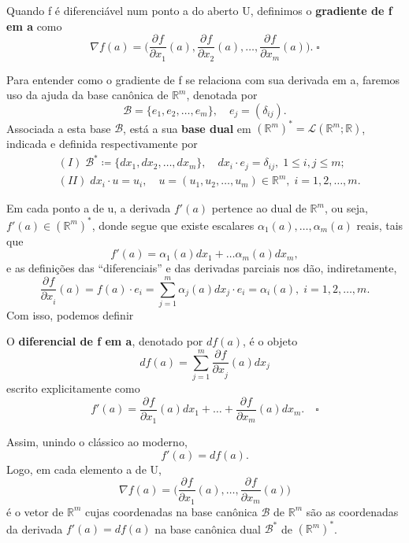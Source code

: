 \documentclass[../analysisII_notes.tex]{subfiles}
\begin{document}
\begin{def*}
	Quando f é diferenciável num ponto a do aberto U, definimos o \textbf{gradiente de f em a} como
	\[
		\nabla f(a) = \biggl(\frac{\partial^{}f}{\partial x_1^{}}(a), \frac{\partial^{}f}{\partial x_2^{}}(a), \dotsc , \frac{\partial^{}f}{\partial x_{m}^{}}(a)\biggr). \;\square
	\]
\end{def*}
Para entender como o gradiente de f se relaciona com sua derivada em a, faremos uso da ajuda da base canônica de \(\mathbb{R}^{m}\), denotada por
\[
	\mathcal{B}=\{e_1, e_2, \dotsc , e_{m}\},\quad e_{j} = (\delta_{ij}).
\]
Associada a esta base \(\mathcal{B}\), está a sua \textbf{base dual} em \((\mathbb{R}^{m})^* = \mathcal{L}(\mathbb{R}^{m}; \mathbb{R})\), indicada e definida respectivamente por
\begin{align*}
	 & (I)\; \mathcal{B}^*\coloneqq \{dx_1, dx_2, \dotsc , dx_{m}\},\quad dx_{i}\cdot e_{j} = \delta_{ij},\; 1\leq i, j\leq m; \\
	 & (II)\; dx_{i}\cdot u = u_{i},\quad u = (u_1, u_2, \dotsc , u_{m})\in \mathbb{R}^{m},\; i = 1, 2, \dotsc , m.
\end{align*}

Em cada ponto a de u, a derivada \(f'(a)\) pertence ao dual de \(\mathbb{R}^{m}\), ou seja, \(f'(a)\in (\mathbb{R}^{m})^*\), donde segue que existe escalares \(\alpha_1(a),\dotsc ,\alpha_{m}(a)\) reais, tais que
\[
	f'(a) = \alpha_1(a)dx_1 + \dotsc \alpha_{m}(a)dx_{m},
\]
e as definições das ``diferenciais'' e das derivadas parciais nos dão, indiretamente,
\[
	\frac{\partial^{}f}{\partial x_{i}^{}}(a) = f(a)\cdot e_{i} = \sum\limits_{j=1}^{m}\alpha_{j}(a)dx_{j}\cdot e_{i} = \alpha_{i}(a),\; i = 1, 2, \dotsc , m.
\]
Com isso, podemos definir
\begin{def*}
	O \textbf{diferencial de f em a}, denotado por \(df(a)\), é o objeto
	\[
		df(a) = \sum\limits_{j=1}^{m}\frac{\partial^{}f}{\partial x_{j}^{}}(a)dx_{j}
	\]
	escrito explicitamente como
	\[
		f'(a) = \frac{\partial^{}f}{\partial x_1^{}}(a)dx_1 + \dotsc + \frac{\partial^{}f}{\partial x_{m}^{}}(a)dx_{m}. \quad \square
	\]
\end{def*}
Assim, unindo o clássico ao moderno,
\[
	f'(a) = df(a).
\]
Logo, em cada elemento a de U,
\[
	\nabla f(a) = \biggl(\frac{\partial^{}f}{\partial x_1^{}}(a),\dotsc , \frac{\partial^{}f}{\partial x_{m}^{}}(a)\biggr)
\]
é o vetor de \( \mathbb{R}^{m}\) cujas coordenadas na base canônica \(\mathcal{B}\) de \(\mathbb{R}^{m}\) são as coordenadas da derivada \(f'(a) = df(a)\) na base canônica dual \(\mathcal{B}^* \) de \((\mathbb{R}^{m})^{*}\).
\end{document}
